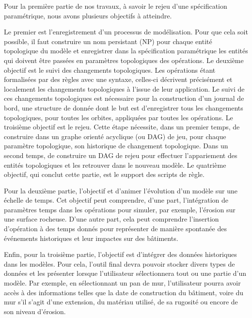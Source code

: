 Pour la première partie de nos travaux, à savoir le rejeu d'une spécification
paramétrique, nous avons plusieurs objectifs à atteindre. %

Le premier est l'enregistrement d'un processus de modélisation. %
Pour que cela soit possible, il faut construire un nom persistant (NP) pour
chaque entité topologique du modèle et enregistrer dans la spécification
paramétrique les entités qui doivent être passées en paramètres topologiques des
opérations. %
Le deuxième objectif est le suivi des changements topologiques. %
Les opérations étant formalisées par des règles avec une syntaxe, celles-ci
décrivent précisément et localement les changements topologiques à l'issue de
leur application. %
Le suivi de ces changements topologiques est nécessaire pour la construction
d'un journal de bord, une structure de donnée dont le but est d'enregistrer tous
les changements topologiques, pour toutes les orbites, appliquées par toutes les
opérations. %
Le troisième objectif est le rejeu. %
Cette étape nécessite, dans un premier temps, de construire dans un graphe
orienté acyclique (ou DAG) de jeu, pour chaque paramètre topologique, son
historique de changement topologique. %
Dans un second temps, de construire un DAG de rejeu pour effectuer l'appariement
des entités topologiques et les retrouver dans le nouveau modèle. %
Le quatrième objectif, qui conclut cette partie, est le support des scripts de
règle. %

Pour la deuxième partie, l'objectif et d'animer l'évolution d'un modèle sur une
échelle de temps. %
Cet objectif peut comprendre, d'une part, l'intégration de paramètres temps dans
les opérations pour simuler, par exemple, l'érosion sur une surface rocheuse. %
D'une autre part, cela peut comprendre l'insertion d'opération à des temps
donnés pour représenter de manière spontanée des événements historiques et leur
impactes sur des bâtiments. %

Enfin, pour la troisième partie, l'objectif est d'intégrer des données
historiques dans les modèles. %
Pour cela, l'outil final devra pouvoir stocker divers types de données et les
présenter lorsque l'utilisateur sélectionnera tout ou une partie d'un modèle. %
Par exemple, en sélectionnant un pan de mur, l'utilisateur pourra avoir accès à
des informations telles que la date de construction du bâtiment, voire du mur
s'il s'agit d'une extension, du matériau utilisé, de sa rugosité ou encore de
son niveau d'érosion. %


